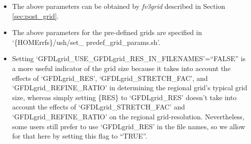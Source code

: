 \documentclass[11pt,fleqn]{report}              %
\begin{document}
\begin{enumerate}
\begin{itemize}
\item The above parameters can be obtained by {\it fv3grid} described in Section \ref{sec:post_grid}. 
\item The above parameters for the pre-defined grids are specified in `\{HOMErrfs\}/ush/set\_ predef\_grid\_params.sh'.
\item Setting `GFDLgrid\_USE\_GFDLgrid\_RES\_IN\_FILENAMES'=``FALSE'' is a more useful indicator of the grid size because it takes into account the effects of `GFDLgrid\_RES', `GFDLgrid\_STRETCH\_FAC', and `GFDLgrid\_REFINE\_RATIO' in determining the regional grid's typical grid size, whereas simply setting \{RES\} to `GFDLgrid\_RES' doesn't take into account the effects of `GFDLgrid\_STRETCH\_FAC' and `GFDLgrid\_REFINE\_RATIO' on the regional grid-resolution.  Nevertheless, some users still prefer to use `GFDLgrid\_RES' in the file names, so we allow for that here by setting this flag to ``TRUE''.
\end{itemize}

\vspace{0.2cm}


\end{enumerate}
\end{document}
